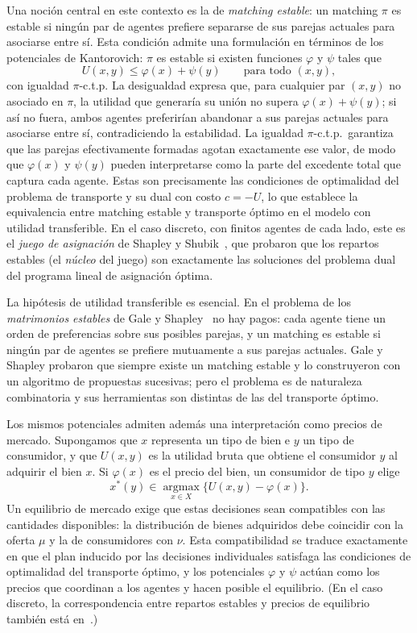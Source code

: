 \documentclass[12pt, a4paper]{amsbook}
\theoremstyle{remark}
\theoremstyle{definition}
\numberwithin{section}{chapter}
\numberwithin{subsection}{section}
\numberwithin{equation}{section}
\numberwithin{figure}{chapter}
\begin{document}
Una noción central en este contexto es la de \emph{matching estable}: un
matching $\pi$ es estable si ningún par de agentes prefiere separarse de sus
parejas actuales para asociarse entre sí. Esta condición admite una
formulación en términos de los potenciales de Kantorovich: $\pi$ es estable
si existen funciones $\varphi$ y $\psi$ tales que
\[
U(x,y)\le\varphi(x)+\psi(y)\qquad\text{para todo }(x,y),
\]
con igualdad $\pi$-c.t.p. La desigualdad expresa que, para cualquier par
$(x,y)$ no asociado en $\pi$, la utilidad que generaría su unión no supera
$\varphi(x)+\psi(y)$; si así no fuera, ambos agentes preferirían abandonar
a sus parejas actuales para asociarse entre sí, contradiciendo la
estabilidad. La igualdad $\pi$-c.t.p.\ garantiza que las parejas
efectivamente formadas agotan exactamente ese valor, de modo que $\varphi(x)$
y $\psi(y)$ pueden interpretarse como la parte del excedente total que captura
cada agente. Estas son precisamente las condiciones de optimalidad del
problema de transporte y su dual con costo $c=-U$, lo que establece la
equivalencia entre matching estable y transporte óptimo en el modelo con
utilidad transferible. En el caso discreto, con finitos agentes de cada lado,
este es el \emph{juego de asignación} de Shapley y
Shubik~\cite{ShapleyShubik1971}, que probaron que los repartos estables (el
\emph{núcleo} del juego) son exactamente las soluciones del problema dual del
programa lineal de asignación óptima.

La hipótesis de utilidad transferible es esencial. En el problema de los
\emph{matrimonios estables} de Gale y Shapley~\cite{GaleShapley1962} no hay
pagos: cada agente tiene un orden de preferencias sobre sus posibles parejas,
y un matching es estable si ningún par de agentes se prefiere mutuamente a
sus parejas actuales. Gale y Shapley probaron que siempre existe un matching
estable y lo construyeron con un algoritmo de propuestas sucesivas; pero el
problema es de naturaleza combinatoria y sus herramientas son distintas de
las del transporte óptimo.

Los mismos potenciales admiten además una interpretación como precios de
mercado. Supongamos que $x$ representa un tipo de bien e $y$ un tipo de
consumidor, y que $U(x,y)$ es la utilidad bruta que obtiene el consumidor $y$
al adquirir el bien $x$. Si $\varphi(x)$ es el precio del bien, un consumidor
de tipo $y$ elige
\[
x^*(y)\in\operatorname*{argmax}_{x\in X}\bigl\{U(x,y)-\varphi(x)\bigr\}.
\]
Un equilibrio de mercado exige que estas decisiones sean compatibles con las
cantidades disponibles: la distribución de bienes adquiridos debe coincidir
con la oferta $\mu$ y la de consumidores con $\nu$. Esta compatibilidad se
traduce exactamente en que el plan inducido por las decisiones individuales
satisfaga las condiciones de optimalidad del transporte óptimo, y los
potenciales $\varphi$ y $\psi$ actúan como los precios que coordinan a los
agentes y hacen posible el equilibrio. (En el caso discreto, la
correspondencia entre repartos estables y precios de equilibrio también está
en~\cite{ShapleyShubik1971}.)
\end{document}
